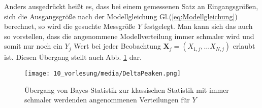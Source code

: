 Anders ausgedrückt heißt es, dass bei einem gemessenen Satz an Eingangsgrößen,
sich die Ausgangsgröße nach der Modellgleichung Gl.(\ref{eq:Modellgleichung}) berechnet,
so wird die gesuchte Messgröße $Y$ festgelegt. Man kann sich das auch so vorstellen, dass
die angenommene Modellverteilung immer schmaler wird und somit nur 
noch ein $Y_j$ Wert bei jeder Beobachtung $\boldsymbol{X}_j = (X_{1,j}, \dots X_{N,j})$ 
erlaubt ist.
Diesen Übergang stellt auch Abb. \ref*{fig:Uebergang_Delta_Funktion} dar. 
\begin{figure}[!htp]
	\begin{center}
		\texttt{[image: 10\_vorlesung/media/DeltaPeaken.png]}
		\caption{Übergang von Bayes-Statistik zur klassischen Statistik mit immer schmaler werdenden angenommenen Verteilungen für $Y$}
		\label{fig:Uebergang_Delta_Funktion}
	\end{center}
\end{figure}

